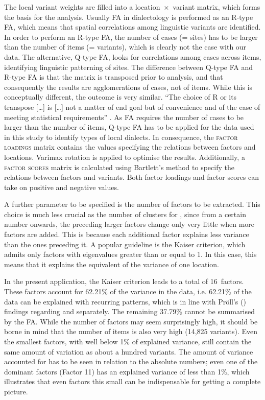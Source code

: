 \documentclass[output=paper]{LSP/langsci}
\begin{document}
The local variant weights are filled into a location~×~variant matrix, which forms the basis for the analysis. Usually FA in dialectology is performed as an R-type FA, which means that spatial correlations among linguistic variants are identified. In order to perform an R-type FA, the number of cases (= sites) has to be larger than the number of items (= variants), which is clearly not the case with our data. The alternative, Q-type FA, looks for correlations among cases across items, identifying linguistic patterning of sites. The difference between Q-type FA and R-type FA is that the matrix is transposed prior to analysis, and that consequently the results are agglomerations of cases, not of items. While this is conceptually different, the outcome is very similar. “The choice of R or its transpose […] is […] not a matter of end goal but of convenience and of the ease of meeting statistical requirements” \citep[326]{cattell_scientific_1978}. As FA requires the number of cases to be larger than the number of items, Q-type FA has to be applied for the data used in this study to identify types of local dialects. In consequence, the \textsc{factor loadings} matrix contains the values specifying the relations between factors and locations. Varimax rotation is applied to optimise the results. Additionally, a \textsc{factor scores} matrix is calculated using Bartlett’s method to specify the relations between factors and variants. Both factor loadings and factor scores can take on positive and negative values.

A further parameter to be specified is the number of factors to be extracted. This choice is much less crucial as the number of clusters for , since from a certain number onwards, the preceding larger factors change only very little when more factors are added. This is because each additional factor explains less variance than the ones preceding it. A popular guideline is the Kaiser criterion, which admits only factors with eigenvalues greater than or equal to 1. In this case, this means that it explains the equivalent of the variance of one location.

In the present application, the Kaiser criterion leads to a total of 16~factors. These factors account for 62.21\% of the variance in the data, i.e. 62.21\% of the data can be explained with recurring patterns, which is in line with Pröll’s (\citeyear{proll_raumvariation_2015}) findings regarding  and  separately. The remaining 37.79\% cannot be summarised by the FA. While the number of factors may seem surprisingly high, it should be borne in mind that the number of items is also very high (14,825 variants). Even the smallest factors, with well below 1\% of explained variance, still contain the same amount of variation as about a hundred variants. The amount of variance accounted for has to be seen in relation to the absolute numbers; even one of the dominant factors (Factor 11) has an explained variance of less than 1\%, which illustrates that even factors this small can be indispensable for getting a complete picture. 
\end{document}
